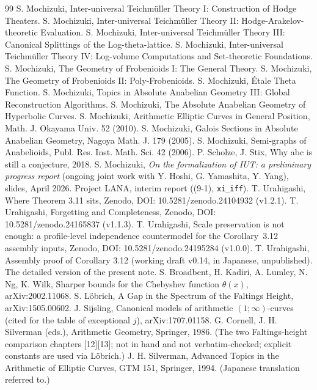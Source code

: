 \documentclass[11pt]{article}
\begin{document}
\begin{thebibliography}{99}
 S. Mochizuki, Inter-universal
Teichm\"uller Theory I: Construction of Hodge Theaters.
 S. Mochizuki, Inter-universal
Teichm\"uller Theory II: Hodge-Arakelov-theoretic Evaluation.
 S. Mochizuki, Inter-universal
Teichm\"uller Theory III: Canonical Splittings of the
Log-theta-lattice.
 S. Mochizuki, Inter-universal
Teichm\"uller Theory IV: Log-volume Computations and Set-theoretic
Foundations.
 S. Mochizuki, The Geometry of Frobenioids I:
The General Theory.
 S. Mochizuki, The Geometry of Frobenioids II:
Poly-Frobenioids.
 S. Mochizuki, \'Etale Theta Function.
 S. Mochizuki, Topics in Absolute
Anabelian Geometry III: Global Reconstruction Algorithms.
 S. Mochizuki, The Absolute Anabelian
Geometry of Hyperbolic Curves.
 S. Mochizuki, Arithmetic Elliptic Curves
in General Position, Math. J. Okayama Univ. 52 (2010).
 S. Mochizuki, Galois Sections in Absolute
Anabelian Geometry, Nagoya Math. J. 179 (2005).
 S. Mochizuki, Semi-graphs of Anabelioids,
Publ. Res. Inst. Math. Sci. 42 (2006).
 P. Scholze, J. Stix, Why abc is still a
conjecture, 2018.
 S. Mochizuki, \emph{On the formalization of
IUT: a preliminary progress report} (ongoing joint work with
Y. Hoshi, G. Yamashita, Y. Yang), slides, April 2026.
 Project LANA, interim report ((9-1),
\texttt{xi\_iff}).
 T. Urahigashi, Where Theorem 3.11 sits, Zenodo,
DOI: 10.5281/zenodo.24104932 (v1.2.1).
 T. Urahigashi, Forgetting and Completeness,
Zenodo, DOI: 10.5281/zenodo.24165837 (v1.1.3).
 T. Urahigashi, Scale preservation is not
enough: a profile-level independence countermodel for the
Corollary~3.12 assembly inputs, Zenodo, DOI: 10.5281/zenodo.24195284
(v1.0.0).
 T. Urahigashi, Assembly proof of Corollary 3.12
(working draft v0.14, in Japanese, unpublished).  The detailed
version of the present note.
 S. Broadbent, H. Kadiri, A. Lumley, N. Ng,
K. Wilk, Sharper bounds for the Chebyshev function $\theta(x)$,
arXiv:2002.11068.
 S. L\"obrich, A Gap in the Spectrum
of the Faltings Height, arXiv:1505.00602.
 J. Sijsling, Canonical models of
arithmetic $(1;\infty)$-curves (cited for the table of exceptional
$j$), arXiv:1707.01158.
 G. Cornell, J. H. Silverman
(eds.), Arithmetic Geometry, Springer, 1986. (The two
Faltings-height comparison chapters [12][13]; not in hand and not
verbatim-checked; explicit constants are used via L\"obrich.)
 J. H. Silverman, Advanced Topics in
the Arithmetic of Elliptic Curves, GTM 151, Springer, 1994.
(Japanese translation referred to.)
\end{thebibliography}
\end{document}
